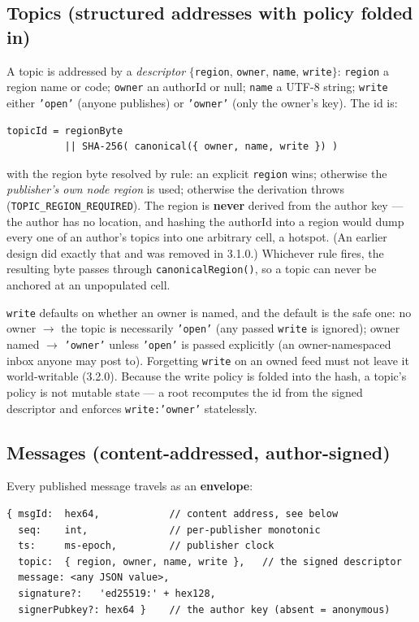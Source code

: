 \documentclass[nobib]{tufte-handout}
\begin{document}
\subsection{Topics (structured addresses with policy folded in)}

A topic is addressed by a \emph{descriptor}
$\{$\texttt{region}, \texttt{owner}, \texttt{name}, \texttt{write}$\}$:
\texttt{region} a region name or code; \texttt{owner} an authorId or
null; \texttt{name} a UTF-8 string; \texttt{write} either
\texttt{'open'} (anyone publishes) or \texttt{'owner'} (only the owner's
key). The id is:

\begin{lstlisting}
topicId = regionByte
          || SHA-256( canonical({ owner, name, write }) )
\end{lstlisting}

\noindent with the region byte resolved by rule: an explicit
\texttt{region} wins; otherwise the \emph{publisher's own node region}
is used; otherwise the derivation throws
(\texttt{TOPIC\_REGION\_REQUIRED}). The region is \textbf{never} derived
from the author key --- the author has no location, and hashing the
authorId into a region would dump every one of an author's topics into
one arbitrary cell, a hotspot. (An earlier design did exactly that and
was removed in 3.1.0.) Whichever rule fires, the resulting byte passes
through \texttt{canonicalRegion()}, so a topic can never be anchored at
an unpopulated cell.

\texttt{write} defaults on whether an owner is named, and the default
is the safe one: no owner $\rightarrow$ the topic is necessarily
\texttt{'open'} (any passed \texttt{write} is ignored); owner named
$\rightarrow$ \texttt{'owner'} unless \texttt{'open'} is passed
explicitly (an owner-namespaced inbox anyone may post to). Forgetting
\texttt{write} on an owned feed must not leave it world-writable
(3.2.0). Because the write policy is folded into the hash, a topic's
policy is not mutable state --- a root recomputes the id from the signed
descriptor and enforces \texttt{write:'owner'} statelessly.

\subsection{Messages (content-addressed, author-signed)}

Every published message travels as an \textbf{envelope}:

\begin{lstlisting}
{ msgId:  hex64,            // content address, see below
  seq:    int,              // per-publisher monotonic
  ts:     ms-epoch,         // publisher clock
  topic:  { region, owner, name, write },   // the signed descriptor
  message: <any JSON value>,
  signature?:   'ed25519:' + hex128,
  signerPubkey?: hex64 }    // the author key (absent = anonymous)
\end{lstlisting}
\end{document}
